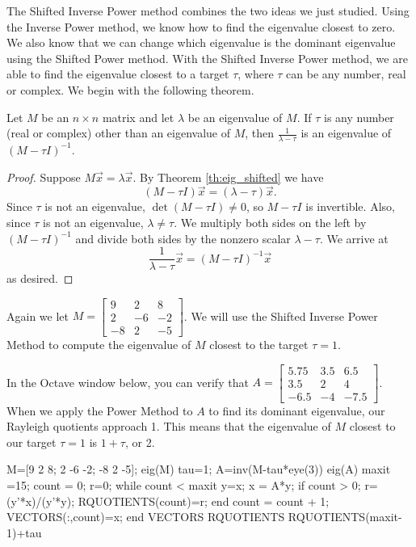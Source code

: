 \documentclass{ximera}
\begin{document}
The Shifted Inverse Power method combines the two ideas we just studied.  Using the Inverse Power method, we know how to find the eigenvalue closest to zero.  We also know that we can change which eigenvalue is the dominant eigenvalue using the Shifted Power method.  With the Shifted Inverse Power method, we are able to find the eigenvalue closest to a target $\tau$, where $\tau$ can be any number, real or complex.    We begin with the following theorem.

\begin{theorem}\label{th:eig_shifted_inverse}
Let $M$ be an $n \times n$ matrix and let $\lambda$ be an eigenvalue of $M$.  If $\tau$ is any number (real or complex) other than an eigenvalue of $M$, then $\frac{1}{\lambda - \tau}$ is an eigenvalue of $(M - \tau I)^{-1}$.
\end{theorem}

\begin{proof}
Suppose $M\vec{x}=\lambda\vec{x}$.  By Theorem \ref{th:eig_shifted} we have 
$$(M - \tau I)\vec{x}=(\lambda-\tau)\vec{x}.$$  
Since $\tau$ is not an eigenvalue, $\det (M - \tau I) \ne 0$, so $M - \tau I$ is invertible.  Also, since $\tau$ is not an eigenvalue, $\lambda \ne \tau$.  We multiply both sides on the left by $(M - \tau I)^{-1}$ and divide both sides by the nonzero scalar $\lambda - \tau$.  We arrive at 
$$\frac{1}{\lambda - \tau}\vec{x} = (M - \tau I)^{-1}\vec{x}$$
as desired.
\end{proof}

Again we let $M=\left[ \begin{array}{rrr}
9 & 2 & 8 \\
2 & -6 & -2 \\
-8 & 2 & -5
\end{array}\right]$.  We will use the Shifted Inverse Power Method to compute the eigenvalue of $M$ closest to the target $\tau = 1$. 

In the Octave window below, you can verify that $A=\left[ \begin{array}{rrr}
5.75 & 3.5 & 6.5 \\
3.5 & 2 & 4 \\
-6.5 & -4 & -7.5
\end{array}\right]$.  When we apply the Power Method to $A$ to find its dominant eigenvalue, our Rayleigh quotients approach 1.  This means that the eigenvalue of $M$ closest to our target $\tau = 1$ is $1+\tau$, or 2.

M=[9 2 8; 2 -6 -2; -8 2 -5];
eig(M)
tau=1;
A=inv(M-tau*eye(3)) %
eig(A)
maxit =15; %
count = 0;
r=0;
    while count < maxit
    y=x;
    x = A*y;
        if count > 0; 
        r=(y'*x)/(y'*y);
        RQUOTIENTS(count)=r;
        end
    count = count + 1;
    VECTORS(:,count)=x;
end
VECTORS
RQUOTIENTS
RQUOTIENTS(maxit-1)+tau
\end{document}

